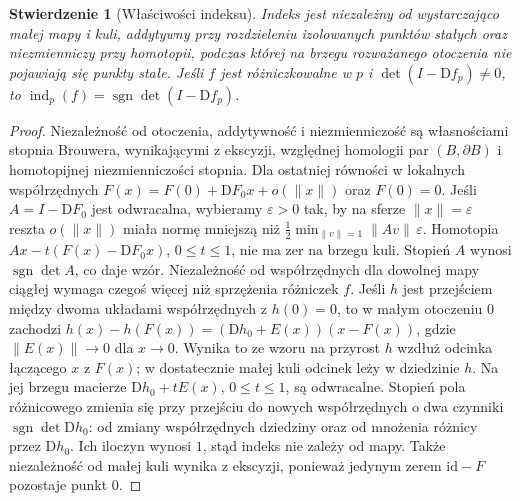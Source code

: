 \documentclass[11pt,a4paper,oneside]{report}
\newcommand{\id}{\mathrm{id}}
\newcommand{\D}{\mathrm D}
\theoremstyle{plain}
\newtheorem{stwierdzenie}[twierdzenie]{Stwierdzenie}
\theoremstyle{definition}
\theoremstyle{remark}
\begin{document}
\begin{stwierdzenie}[Właściwości indeksu]
Indeks jest niezależny od wystarczająco małej mapy i kuli,
addytywny przy rozdzieleniu izolowanych punktów stałych
oraz niezmienniczy przy homotopii, podczas której
na brzegu rozważanego otoczenia nie pojawiają się punkty
stałe. Jeśli $f$ jest różniczkowalne w $p$
i $\det(I-\D f_p)\ne0$, to
$\operatorname{ind}_p(f)=\operatorname{sgn}\det(I-\D f_p)$.
\end{stwierdzenie}
\begin{proof}
Niezależność od otoczenia, addytywność i niezmienniczość
są własnościami stopnia Brouwera, wynikającymi
z ekscyzji, względnej homologii par $(B,\partial B)$
i homotopijnej niezmienniczości stopnia.
Dla ostatniej równości w lokalnych współrzędnych
$F(x)=F(0)+\D F_0x+o(\|x\|)$ oraz $F(0)=0$.
Jeśli $A=I-\D F_0$ jest odwracalna, wybieramy
$\varepsilon>0$ tak, by na sferze $\|x\|=\varepsilon$
reszta $o(\|x\|)$ miała normę mniejszą niż
$\tfrac12\min_{\|v\|=1}\|Av\|\,\varepsilon$.
Homotopia $Ax-t(F(x)-\D F_0x)$, $0\le t\le1$,
nie ma zer na brzegu kuli. Stopień $A$ wynosi
$\operatorname{sgn}\det A$, co daje wzór.
Niezależność od współrzędnych dla dowolnej mapy ciągłej
wymaga czegoś więcej niż sprzężenia różniczek $f$.
Jeśli $h$ jest przejściem między dwoma układami współrzędnych
z $h(0)=0$, to w małym otoczeniu $0$ zachodzi
$h(x)-h(F(x))=(\D h_0+E(x))(x-F(x))$,
gdzie $\|E(x)\|\to0$ dla $x\to0$. Wynika to ze wzoru
na przyrost $h$ wzdłuż odcinka łączącego $x$ z $F(x)$;
w dostatecznie małej kuli odcinek leży w dziedzinie $h$.
Na jej brzegu macierze $\D h_0+tE(x)$, $0\le t\le1$,
są odwracalne. Stopień pola różnicowego zmienia się przy
przejściu do nowych współrzędnych o dwa czynniki
$\operatorname{sgn}\det\D h_0$: od zmiany współrzędnych
dziedziny oraz od mnożenia różnicy przez $\D h_0$.
Ich iloczyn wynosi $1$, stąd indeks nie zależy od mapy.
Także niezależność od małej kuli wynika z ekscyzji,
ponieważ jedynym zerem $\id-F$ pozostaje punkt $0$.
\end{proof}
\end{document}
